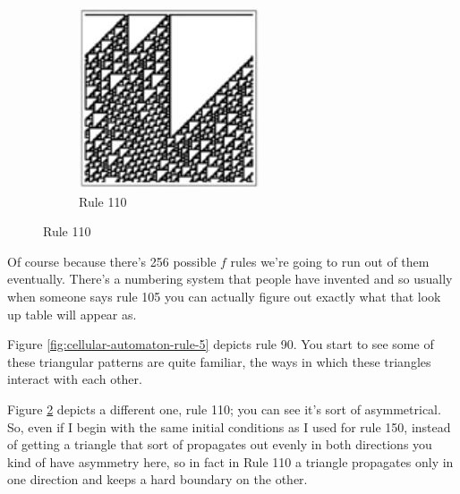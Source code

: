 \documentclass[]{article}
\begin{document}
\begin{figure}[H]
\begin{center}
\begin{subfigure}[t]{0.3\textwidth}
		\end{subfigure}
		\begin{subfigure}[t]{0.3\textwidth}
			\caption{Rule 110}\label{fig:cellular-automaton-rule-6}
			\includegraphics[width=\textwidth]{cellular-automaton-rule-6}
		\end{subfigure}
	\end{center}
\end{figure}
Of course because there's 256 possible $f$ rules
we're going to run out of them eventually.
There's a numbering system that people have invented and so usually when someone says rule 105 you can actually figure out exactly
what that look up table will appear as.

Figure \ref{fig:cellular-automaton-rule-5} depicts rule 90.
You start to see some of these triangular patterns are quite familiar, the ways in which these triangles interact with each other.

Figure \ref{fig:cellular-automaton-rule-6} depicts a different one,
rule 110; you can see it's sort of asymmetrical.
So, even if I begin with the same initial conditions as I used for rule 150, instead of getting a triangle that sort of propagates out evenly in both directions
you kind of have asymmetry here, so in fact in Rule 110 a triangle propagates only in one direction and keeps a hard boundary on the other.
\end{document}

